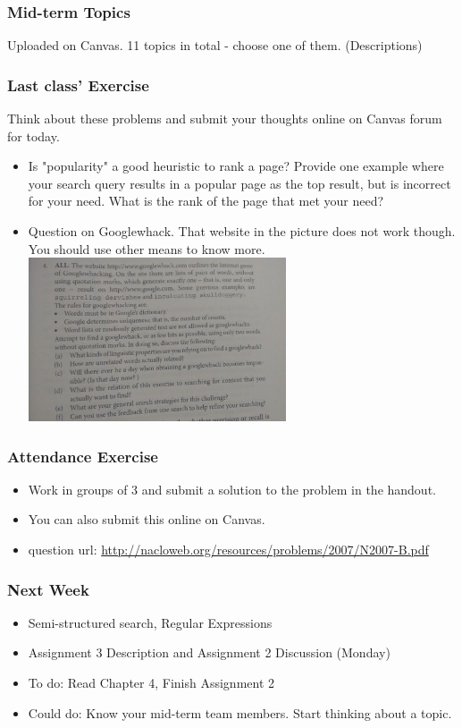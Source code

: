 \documentclass{beamer}
\begin{document}
\begin{frame}
\frametitle{Mid-term Topics}
Uploaded on Canvas. 
11 topics in total - choose one of them. (Descriptions)
\end{frame}

\begin{frame}
\frametitle{Last class' Exercise}
Think about these problems and submit your thoughts online on Canvas forum for today. 
\begin{itemize}
\item Is "popularity" a good heuristic to rank a page? Provide one example where your search query results in a popular page as the top result, but is incorrect for your need. What is the rank of the page that met your need?
\item Question on Googlewhack. That website in the picture does not work though. You should use other means to know more.  
\includegraphics[width=0.6\textwidth]{20Sep-120Exercise.jpg}
\end{itemize}
\end{frame}

\begin{frame}
\frametitle{Attendance Exercise}
\begin{itemize}
\item Work in groups of 3 and submit a solution to the problem in the handout.
\item You can also submit this online on Canvas.
\item question url: \url{http://nacloweb.org/resources/problems/2007/N2007-B.pdf}
\end{itemize}
\end{frame}

\begin{frame}
\frametitle{Next Week}
\begin{itemize}
\item Semi-structured search, Regular Expressions
\item Assignment 3 Description and Assignment 2 Discussion (Monday) 
\item To do: Read Chapter 4, Finish Assignment 2
\item Could do: Know your mid-term team members. Start thinking about a topic.
\end{itemize}
\end{frame}
\end{document}
